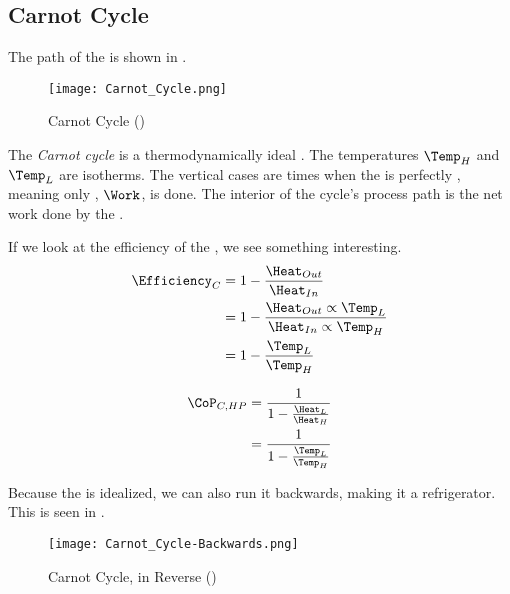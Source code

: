 \subsection{Carnot Cycle}\label{subsec:Carnot_Cycle}
The  path of the  is shown in .

\begin{figure}[h!tbp]
  \centering
  \texttt{[image: Carnot\_Cycle.png]}
  \caption{Carnot Cycle (\cite[pg. 252]{ThermoTextbook})}
  \label{fig:Carnot_Cycle}
\end{figure}

\begin{definition}\label{def:Carnot_Cycle}
  The \emph{Carnot cycle} is a thermodynamically ideal .
  The temperatures $\Temp_{H}$ and $\Temp_{L}$ are isotherms.
  The vertical cases are times when the  is perfectly , meaning only , $\Work$, is done.
  The interior of the cycle's process path is the net work done by the .
\end{definition}

If we look at the efficiency of the , we see something interesting.
\begin{align*}
  \Efficiency_{C} &= 1 - \frac{\Heat_{Out}}{\Heat_{In}} \\
                  &= 1 - \frac{\Heat_{Out} \propto \Temp_{L}}{\Heat_{In} \propto \Temp_{H}} \\
                  &= 1 - \frac{\Temp_{L}}{\Temp_{H}}
\end{align*}

\begin{equation}\label{eq:Coefficient_of_Performance-Carnot_Cycle}
  \begin{aligned}
    \CoP_{C, HP} &= \frac{1}{1 - \frac{\Heat_{L}}{\Heat_{H}}} \\
    &= \frac{1}{1 - \frac{\Temp_{L}}{\Temp_{H}}} \\
  \end{aligned}
\end{equation}

Because the  is idealized, we can also run it backwards, making it a refrigerator.
This is seen in .

\begin{figure}[h!tbp]
  \centering
  \texttt{[image: Carnot\_Cycle-Backwards.png]}
  \caption{Carnot Cycle, in Reverse (\cite[pg. 253]{ThermoTextbook})}
  \label{fig:Carnot_Cycle-Backwards}
\end{figure}


